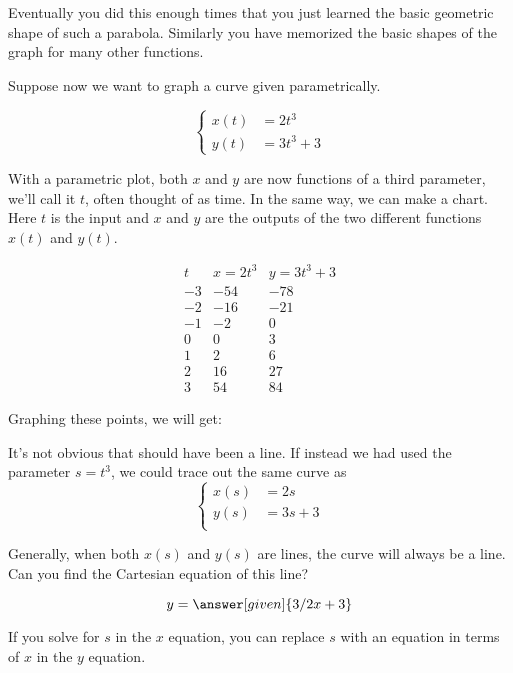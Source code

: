 \documentclass{ximera}
\begin{document}
Eventually you did this enough times that you just learned the basic geometric shape of such a parabola. Similarly you have memorized the basic shapes of the graph for many other functions.

Suppose now we want to graph a curve given parametrically.


\[
\begin{cases}
x(t)&=2t^3 \\
y(t)&=3t^3+3
\end{cases}
\]



With a parametric plot, both $x$ and $y$ are now functions of a third parameter, we'll call it $t$, often thought of as time. In the same way, we can make a chart. Here $t$ is the input and $x$ and $y$ are the outputs of the two different functions $x(t)$ and $y(t)$.

\[
\begin{array}{c|c|c}
  t  & x = 2t^3 & y = 3t^3+3\\\hline
-3  & -54 & -78 \\
-2  & -16& -21 \\
-1  & -2 & 0 \\
 0  & 0  & 3 \\
  1  & 2 & 6 \\
  2  & 16 & 27 \\
  3  & 54 & 84

\end{array}
\]
\begin{onlineOnly}
Graphing these points, we will get:



\end{onlineOnly}

It's not obvious that should have been a line.  If instead we had used the parameter $s=t^3$, we could trace out the same curve as
\[
\begin{cases}
x(s)&=2s \\
y(s)&=3s+3 \\
\end{cases}
\]

Generally, when both $x(s)$ and $y(s)$ are lines, the curve will always be a line.  Can you find the Cartesian equation of this line?

\[
y = \answer[given]{3/2x+3}
\]
\begin{hint}
If you solve for $s$ in the $x$ equation, you can replace $s$ with an equation in terms of $x$ in the $y$ equation.
\end{hint}
\end{document}
